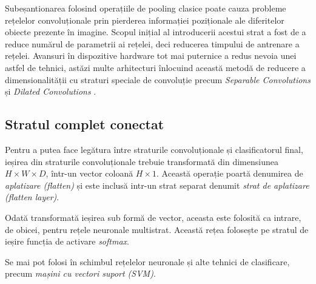 Subeșantionarea folosind operațiile de pooling clasice poate cauza probleme rețelelor convoluționale prin pierderea informației poziționale ale diferitelor obiecte prezente în imagine. Scopul inițial al introducerii acestui strat a fost de a reduce numărul de parametrii ai rețelei, deci reducerea timpului de antrenare a rețelei. Avansuri în dispozitive hardware tot mai puternice a redus nevoia unei astfel de tehnici, astăzi multe arhitecturi înlocuind această metodă de reducere a dimensionalității cu straturi speciale de convoluție precum \textit{Separable Convolutions} și \textit{Dilated Convolutions} \cite{online:cnn-types}.

\subsection*{Stratul complet conectat}\label{subch:strat-complet-con}
Pentru a putea face legătura între straturile convoluționale și clasificatorul final, ieșirea din straturile convoluționale trebuie transformată din dimensiunea $H\times W\times D$, într-un vector coloană $H\times1$. Această operație poartă denumirea de \textit{aplatizare (flatten)} și este inclusă intr-un strat separat denumit \textit{strat de aplatizare (flatten layer)}.

Odată transformată ieșirea sub formă de vector, aceasta este folosită ca intrare, de obicei, pentru rețele neuronale multistrat. Această rețea folosește pe stratul de ieșire funcția de activare \textit{softmax}.

Se mai pot folosi în schimbul rețelelor neuronale și alte tehnici de clasificare, precum \textit{mașini cu vectori suport (SVM)}.

